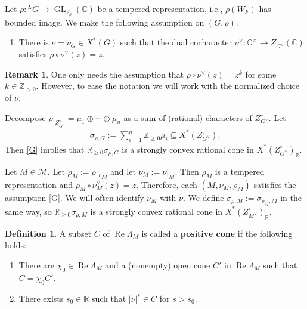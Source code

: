 \documentclass[10pt]{amsart}
\theoremstyle{definition}
\newtheorem{remark}[theorem]{Remark}
\newtheorem{definition}[theorem]{Definition}
\numberwithin{equation}{section}
\DeclareMathOperator{\GL}{\mathrm{GL}}
\numberwithin{equation}{subsection}
\newcommand{\ZZ}{\mathbb{Z}}
\newcommand{\CC}{\mathbb{C}}
\renewcommand{\Re}{\mathop{\mathrm{Re}}}
\begin{document}
Let $\rho:{}^LG\to \GL_{V_\rho}(\mathbb{C})$ be a tempered representation, i.e., $\rho(W_F)$ has bounded image. We make the following assumption on $(G,\rho)$.
\begin{enumerate}[label=(G), ref=G]
    \item \label{G}
    There is $\nu=\nu_G\in X^\ast(G)$ such that the dual cocharacter $\nu^\lor:\CC^\times \longrightarrow Z_{G^\vee}(\CC)$ satisfies $\rho\circ \nu^\lor(z)=z$.
\end{enumerate}

\begin{remark}\label{rem:relaxation}
    One only needs the assumption that $\rho\circ \nu^\lor(z)=z^k$ for some $k\in \ZZ_{>0}.$ However, to ease the notation we will work with the normalized choice of $\nu$.
\end{remark}

    Decompose  $\rho\vert_{Z_{G^\vee}^\circ} =\mu_1\oplus\cdots\oplus\mu_n$ as a sum of (rational) characters of $Z_{G^\vee}^\circ$. Let 
\begin{align*}
\sigma_{\rho,G} := \sum_{i=1}^n \mathbb{Z}_{\geq 0}\mu_i\subseteq X^*(Z_{G^\vee}^\circ).
\end{align*}
Then \eqref{G} implies that $\mathbb{R}_{\geq 0}\sigma_{\rho,G}$ is a strongly convex rational cone in $X^*(Z_{G^\vee}^\circ)_{\mathbb{R}}$. 



Let $M\in \mathcal{M}.$ Let $\rho_M := \rho\vert_{{}^LM}$ and let $\nu_M:=\nu\vert_{M}$. Then $\rho_M$ is a tempered representation and $\rho_M\circ \nu_M^\lor(z)=z$. Therefore, each $(M,\nu_M,\rho_M)$ satisfies the assumption \eqref{G}. We will often identify $\nu_M$ with $\nu$. We define $\sigma_{\rho,M}:=\sigma_{\rho_M,M}$ in the same way, so $\mathbb{R}_{\geq 0}\sigma_{\rho,M}$ is a strongly convex rational cone in $X^*(Z_{M^\vee}^\circ)_{\mathbb{R}}$.

\begin{definition}\label{def:positivecone}
    A subset $C$ of $\Re\Lambda_M$ is called a \textbf{positive cone} if the following holds:
\begin{enumerate}
    \item [(C1)] There are $\chi_0\in \Re\Lambda_M$ and a (nonempty) open cone $C'$ in $\Re\Lambda_M$ such that $C=\chi_0C'$.
    \item [(C2)] There exists $s_0\in\mathbb{R}$ such that $|\nu|^{s}\in C$ for $s>s_0$.
\end{enumerate}

\end{definition}
\end{document}
